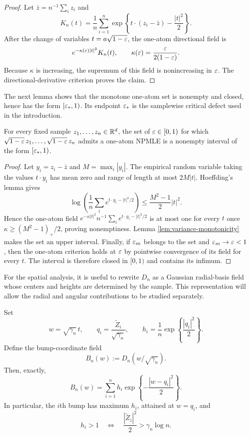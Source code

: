 \begin{proof}
Let $\bar z=n^{-1}\sum_i z_i$ and
\[
 K_n(t)=\frac1n\sum_{i=1}^n
 \exp\left\{t\cdot(z_i-\bar z)-\frac{|t|^2}{2}\right\}.
\]
After the change of variables $t=a\sqrt{1-\varepsilon}$, the one-atom directional
field is
\[
 e^{-\kappa(\varepsilon)|t|^2}K_n(t),
 \qquad
 \kappa(\varepsilon)=\frac{\varepsilon}{2(1-\varepsilon)}.
\]
Because $\kappa$ is increasing, the supremum of this field is nonincreasing
in $\varepsilon$. The directional-derivative criterion proves the claim.
\end{proof}

The next lemma shows that the monotone one-atom set is nonempty and closed,
hence has the form \([\varepsilon_*,1)\). Its endpoint \(\varepsilon_*\) is the samplewise
critical defect used in the introduction.
\begin{lemma}
\label{lem:critical-defect-interval}
For every fixed sample $z_1,\ldots,z_n\in\mathbb R^d$, the set of
$\varepsilon\in[0,1)$ for which
$\sqrt{1-\varepsilon}\,z_1,\ldots,\sqrt{1-\varepsilon}\,z_n$ admits a one-atom NPMLE is
a nonempty interval of the form $[\varepsilon_*,1)$.
\end{lemma}

\begin{proof}
Let $y_i=z_i-\bar z$ and $M=\max_i|y_i|$. The empirical random variable
taking the values $t\cdot y_i$ has mean zero and range of length at most
$2M|t|$. Hoeffding's lemma gives
\[
 \log\left(\frac1n\sum_i e^{t\cdot y_i-|t|^2/2}\right)
 \le \frac{M^2-1}{2}|t|^2.
\]
Hence the one-atom field
$e^{-\kappa|t|^2}n^{-1}\sum_i e^{t\cdot y_i-|t|^2/2}$ is at most one
for every $t$ once $\kappa\ge(M^2-1)_+/2$, proving nonemptiness. Lemma
\ref{lem:variance-monotonicity} makes the set an upper interval. Finally, if
$\varepsilon_m$ belongs to the set and $\varepsilon_m\to\varepsilon<1$, then the one-atom
criterion holds at $\varepsilon$ by pointwise convergence of its field for every
$t$. The interval is therefore closed in $[0,1)$ and contains its infimum.
\end{proof}

For the spatial analysis, it is useful to rewrite \(D_n\) as a Gaussian
radial-basis field whose centers and heights are determined by the sample.
This representation will allow the radial and angular contributions to be
studied separately.

\begin{lemma}
\label{lem:bump-representation}
Set
\[
  w=\sqrt{\gamma_n}\,t,
  \qquad
  q_i=\frac{\widetilde Z_i}{\sqrt{\gamma_n}},
  \qquad
  h_i=\frac1n\exp\left\{\frac{|q_i|^2}{2}\right\}.
\]
Define the bump-coordinate field
\[
  B_n(w):=D_n(w/\sqrt{\gamma_n}).
\]
Then, exactly,
\begin{equation}
\label{eq:bump-representation}
  B_n(w)
  =
  \sum_{i=1}^n h_i
  \exp\left\{-\frac{|w-q_i|^2}{2}\right\}.
\end{equation}
In particular, the \(i\)th bump has maximum \(h_i\), attained at \(w=q_i\),
and
\begin{equation}
\label{eq:one-point-threshold}
  h_i>1
  \quad\Longleftrightarrow\quad
  \frac{|\widetilde Z_i|^2}{2}>\gamma_n\log n.
\end{equation}
\end{lemma}

